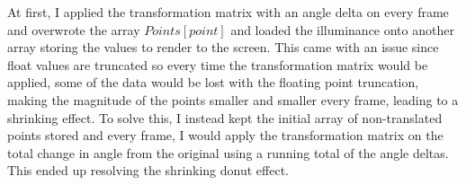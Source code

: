 \documentclass{article}
\begin{document}
\begin{flushleft}
At first, I applied the transformation matrix with an angle delta on every frame and overwrote the array $Points[point]$ and loaded the illuminance onto another array storing the values to render to the screen. This came with an issue since float values are truncated so every time the transformation matrix would be applied, some of the data would be lost with the floating point truncation, making the magnitude of the points smaller and smaller every frame, leading to a shrinking effect. To solve this, I instead kept the initial array of non-translated points stored and every frame, I would apply the transformation matrix on the total change in angle from the original using a running total of the angle deltas. This ended up resolving the shrinking donut effect.
\end{flushleft}
\end{document}
